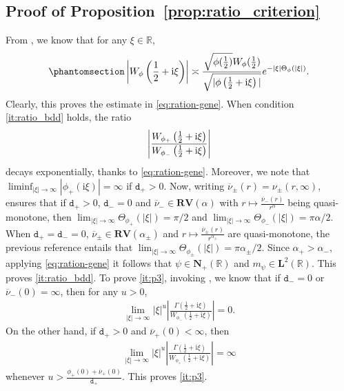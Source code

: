\documentclass[12pt]{amsart}
\newcommand{\hlabel}{\phantomsection\label}
\numberwithin{equation}{section}
\newcommand{\bb}{\mathbb}
\newcommand{\ov}{\overline}
\newcommand{\ttt}{\mathtt}
\newcommand{\bmrm}[2][2]{\mathbf{#2}^{#1}}
\renewcommand{\i}{\mathrm{i}}
\theoremstyle{definition}
\theoremstyle{assump}
\theoremstyle{remark}
\begin{document}
{\subsection{Proof of Proposition~\ref{prop:ratio_criterion}} \hlabel{sec:prop2.2} From \cite[Theorem 6.2(1)]{patiesavov}, we know that for any $\xi \in \bb{R}$,
	\begin{align}\hlabel{eq:ratio-gene2}
		\left|W_{\phi}\left(\frac{1}{2}+{\rm{i}}\xi\right)   \right|\asymp\frac{\sqrt{\phi(\frac{1}{2})}W_{\phi}(\frac{1}{2})}{\sqrt{|\phi\left(\frac{1}{2}+{\rm{i}}\xi\right)   |}}e^{-|\xi|\Theta_\phi(|\xi|)}.
	\end{align}
	Clearly, this proves the estimate in \eqref{eq:ration-gene}.
	When condition \eqref{it:ratio_bdd} holds, the ratio \[\left|\frac{W_{\phi_+}\left(\frac{1}{2}+{\rm{i}}\xi\right)}{W_{\phi_-}\left(\frac{1}{2}+{\rm{i}}\xi\right)   }\right|\] decays exponentially, thanks to \eqref{eq:ration-gene}. Moreover, we note that $\liminf_{|\xi|\to\infty} |\phi_+(\i\xi)|=\infty$ if $\ttt{d}_+>0$. Now, writing $\ov{\nu}_\pm(r)=\nu_\pm(r,\infty)$, \cite[Theorem 3.3(2)]{patie2018} ensures that if $\ttt{d}_+>0$, $\ttt{d}_-=0$ and $\overline{\nu}_-\in\mathbf{RV}(\alpha)$ with $r\mapsto\frac{\overline{\nu}_-(r)}{r^\alpha}$ being quasi-monotone, then $\lim_{|\xi|\to\infty}\Theta_{\phi_+}(|\xi|)=\pi/2$ and $\lim_{|\xi|\to\infty}\Theta_{\phi_-}(|\xi|)=\pi\alpha/2$. When $\ttt{d}_+=\ttt{d}_-=0$, $\ov{\nu}_\pm\in\mathbf{RV}(\alpha_\pm)$ and $r\mapsto\frac{\ov{\nu}_\pm(r)}{r^{\alpha_\pm}}$ are quasi-monotone, the previous reference entails that $\lim_{|\xi|\to\infty}\Theta_{\phi_\pm}(|\xi|)=\pi\alpha_\pm/2$. Since $\alpha_+>\alpha_-$, applying \eqref{eq:ration-gene} it follows that $\psi\in\mathbf{N}_+(\bb{R})$ and $m_\psi\in\bmrm{L}(\bb R)$. This proves \eqref{it:ratio_bdd}. To prove \eqref{it:p3}, invoking \cite[Proposition~6.2]{patie2018}, we know that if $\ttt{d}_-=0$ or $\ov{\nu}_{-}(0)=\infty$, then for any $u>0$,
	\begin{align*}
		\lim_{|\xi|\to\infty}|\xi|^u\left|\frac{\Gamma\left(\frac{1}{2}+\mathrm{i}\xi\right)}{W_{\phi_-}\left(\frac{1}{2}+\mathrm{i}\xi\right)}\right|=0.
	\end{align*} On the other hand, if $\ttt{d}_+>0$ and $\ov{\nu}_+(0)<\infty$, then
	\begin{align*}
		\lim_{|\xi|\to\infty}|\xi|^u\left|\frac{\Gamma\left(\frac{1}{2}+\mathrm{i}\xi\right)}{W_{\phi_+}\left(\frac{1}{2}+\mathrm{i}\xi\right)}\right|=\infty
	\end{align*}
whenever $u>\frac{\phi_+(0)+\ov{\nu}_+(0)}{\ttt{d}_+}$. This proves \eqref{it:p3}.

}
\end{document}
